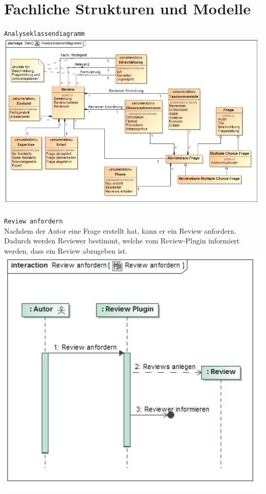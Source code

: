 \documentclass[a4paper]{scrreprt}
\begin{document}
\section{Fachliche Strukturen und Modelle}
\texttt{Analyseklassendiagramm}\\
\includegraphics[width=1.0\textwidth]{Class_Diagram__Analyseklassendiagramm.png}
\label{Analyseklassendiagramm}

\newpage
\texttt{Review anfordern}\\
Nachdem der Autor eine Frage erstellt hat, kann er ein Review anfordern. Dadurch werden Reviewer bestimmt, welche vom Review-Plugin informiert werden, dass ein Review abzugeben ist.\\

\includegraphics[width=1.0\textwidth]{Sequence_Diagram__Review_anfordern__Review_anfordern.png}
\label{Review anfordern}
\end{document}
